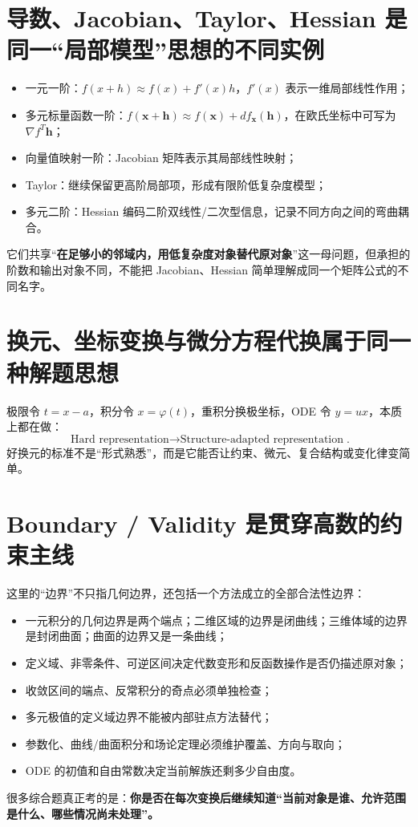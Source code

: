 \documentclass[11pt,a4paper,openany]{ctexbook}
\newcommand{\key}[1]{\textbf{\color{deep}#1}}
\begin{document}
\section{导数、Jacobian、Taylor、Hessian 是同一“局部模型”思想的不同实例}
\begin{itemize}
  \item 一元一阶：$f(x+h)\approx f(x)+f'(x)h$，$f'(x)$ 表示一维局部线性作用；
  \item 多元标量函数一阶：$f(\bm x+\bm h)\approx f(\bm x)+df_{\bm x}(\bm h)$，在欧氏坐标中可写为 $\nabla f^T\bm h$；
  \item 向量值映射一阶：Jacobian 矩阵表示其局部线性映射；
  \item Taylor：继续保留更高阶局部项，形成有限阶低复杂度模型；
  \item 多元二阶：Hessian 编码二阶双线性/二次型信息，记录不同方向之间的弯曲耦合。
\end{itemize}
它们共享“\key{在足够小的邻域内，用低复杂度对象替代原对象}”这一母问题，但承担的阶数和输出对象不同，不能把 Jacobian、Hessian 简单理解成同一个矩阵公式的不同名字。

\section{换元、坐标变换与微分方程代换属于同一种解题思想}
极限令 $t=x-a$，积分令 $x=\varphi(t)$，重积分换极坐标，ODE 令 $y=ux$，本质上都在做：
\[
\boxed{\text{Hard representation}\to\text{Structure-adapted representation}}.
\]
好换元的标准不是“形式熟悉”，而是它能否让约束、微元、复合结构或变化律变简单。

\section{Boundary / Validity 是贯穿高数的约束主线}
这里的“边界”不只指几何边界，还包括一个方法成立的全部合法性边界：
\begin{itemize}
  \item 一元积分的几何边界是两个端点；二维区域的边界是闭曲线；三维体域的边界是封闭曲面；曲面的边界又是一条曲线；
  \item 定义域、非零条件、可逆区间决定代数变形和反函数操作是否仍描述原对象；
  \item 收敛区间的端点、反常积分的奇点必须单独检查；
  \item 多元极值的定义域边界不能被内部驻点方法替代；
  \item 参数化、曲线/曲面积分和场论定理必须维护覆盖、方向与取向；
  \item ODE 的初值和自由常数决定当前解族还剩多少自由度。
\end{itemize}
很多综合题真正考的是：\key{你是否在每次变换后继续知道“当前对象是谁、允许范围是什么、哪些情况尚未处理”。}
\end{document}
